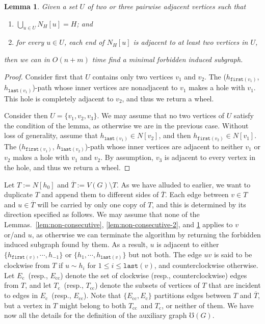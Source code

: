 \documentclass[10pt]{article}
\newtheorem{lemma}[theorem]{Lemma}
\newcommand{\badgraph}{minimal forbidden induced subgraph}
\newcommand{\head}[1]{\ensuremath{{\mathtt{last}(#1)}}}
\newcommand{\tail}[1]{\ensuremath{{\mathtt{first}(#1)}}}
\newcommand{\stpath}[2]{($#1$, $#2$)-path}
\newcommand{\ec}{\ensuremath{E_{\text{c}}}}
\newcommand{\ecc}{\ensuremath{E_{\text{cc}}}}
\newcommand{\oc}{\ensuremath{T_{\text{c}}}}
\newcommand{\oo}{\ensuremath{T}}
\newcommand{\occ}{\ensuremath{T_{\text{cc}}}}
\begin{document}
\begin{lemma}\label{lem:non-helly}
  Given a set $U$ of two or three pairwise adjacent vertices such that
  \begin{enumerate}[1)]
  \item $\bigcup_{u\in U} N_H[u] = H$; and 
  \item for every $u\in U$, each end of $N_H[u]$ is adjacent to at
    least two vertices in $U$,
  \end{enumerate}
  then we can in $O(n+m)$ time find a \badgraph.
\end{lemma}
\begin{proof}
  Consider first that $U$ contains only two vertices $v_1$ and $v_2$.
  The \stpath{h_{\tail{v_1}}}{h_{\head{v_1}}} whose inner vertices are
  nonadjacent to $v_1$ makes a hole with $v_1$.  This hole is
  completely adjacent to $v_2$, and thus we return a wheel.

  Consider then $U = \{v_1, v_2, v_3\}$.  We may assume that no two
  vertices of $U$ satisfy the condition of the lemma, as otherwise we
  are in the previous case.  Without loss of generality, assume that
  $h_{\head{v_1}}\in N[v_2]$, and then $h_{\tail{v_2}}\in N[v_1]$.
  The \stpath{h_{\tail{v_1}}}{h_{\head{v_2}}} whose inner vertices are
  adjacent to neither $v_1$ or $v_2$ makes a hole with $v_1$ and
  $v_2$.  By assumption, $v_3$ is adjacent to every vertex in the
  hole, and thus we return a wheel.
\end{proof}

Let $\oo := N[h_0]$ and $\overline{\oo} := V(G)\setminus \oo$.  As we
have alluded to earlier, we want to duplicate $\oo$ and append them to
different sides of $\overline{\oo}$.  Each edge between $v\in \oo$ and
$u\in \overline{\oo}$ will be carried by only one copy of $T$, and
this is determined by its direction specified as follows.  We may
assume that none of the Lemmas.~\ref{lem:non-consecutive},
\ref{lem:non-consecutive-2}, and \ref{lem:non-helly} applies to $v$
or/and $u$, as otherwise we can terminate the algorithm by returning
the forbidden induced subgraph found by them.  As a result, $u$ is
adjacent to either $\{h_{\tail{v}},\cdots, h_{-1}\}$ or $\{h_1,\cdots,
h_{\head{v}}\}$ but not both.  The edge $u v$ is said to be clockwise
from $\oo$ if $u\sim h_i$ for $1\le i\le {\head{v}}$, and
counterclockwise otherwise.  Let \ec\ (resp., \ecc) denote the set of
clockwise (resp., counterclockwise) edges from $\oo$, and let \oc\
(resp., \occ) denote the subsets of vertices of $\oo$ that are
incident to edges in \ec\ (resp., \ecc).  Note that $\{\ecc,\ec\}$
partitions edges between $\oo$ and $\overline{\oo}$, but a vertex in
$\oo$ might belong to both \occ\ and \oc, or neither of them.  We have
now all the details for the definition of the auxiliary graph
$\mho(G)$.
\end{document}
